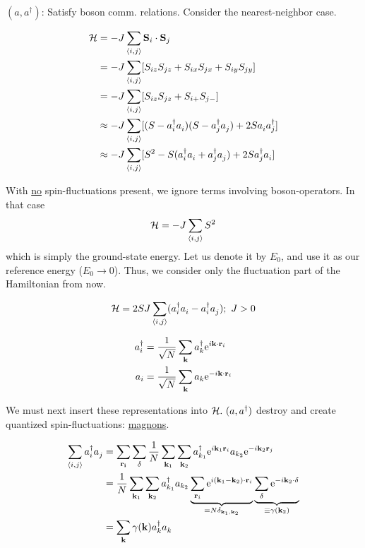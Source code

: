 $(a, a^\dagger)$: Satisfy boson comm. relations. Consider the nearest-neighbor case.

\begin{align}
    \mathcal{H} &= -J\sum_{\langle i,j \rangle} \vb{S}_i\cdot\vb{S}_j \\
    &= -J\sum_{\langle i, j \rangle}[S_{iz}S_{jz} + S_{ix}S_{jx} + S_{iy}S_{jy}]\\
    &= -J\sum_{\langle i, j \rangle}[S_{iz}S_{jz} + S_{i+}S_{j-}] \\
    &\approx -J\sum_{\langle i, j \rangle}[(S-a_i^\dagger a_i^{})(S-a_j^\dagger a_j^{}) + 2S a_i^{} a_j^\dagger]\\
    &\approx -J\sum_{\langle i, j \rangle}[S^2 - S(a_i^\dagger a_i^{} + a_j^\dagger a_j^{}) + 2S a_j^\dagger a_i^{}]
\end{align}

With \uline{no} spin-fluctuations present, we ignore terms involving boson-operators. In that case 
\begin{equation}
    \mathcal{H} = -J \sum_{\langle i, j \rangle} S^2
\end{equation}
which is simply the ground-state energy. Let us denote it by $E_0$, and use it as our reference energy ($E_0 \rightarrow 0$). Thus, we consider only the fluctuation part of the Hamiltonian from now.

\begin{equation}
    \mathcal{H} = 2SJ\sum_{\langle i, j \rangle} (a_i^\dagger a_i^{} - a_i^\dagger a_j^{}); \ J > 0
\end{equation}

\begin{align}
    a_i^\dagger &= \frac{1}{\sqrt{N}}\sum_{\vb{k}}a_k^\dagger \mathrm{e}^{i\vb{k}\cdot\vb{r}_i} \\
    a_i &= \frac{1}{\sqrt{N}}\sum_{\vb{k}}a_k \mathrm{e}^{-i\vb{k}\cdot\vb{r}_i}
\end{align}

We must next insert these representations into $\mathcal{H}. \ (a, a^\dagger)$ destroy and create quantized spin-fluctuations: \uline{magnons}.

\begin{align}
    \sum_{\langle i, j \rangle} a_i^\dagger a_j^{}
    &= \sum_{\vb{r_i}}\sum_{\vb{\delta}} \frac{1}{N}\sum_{\vb{k}_1}\sum_{\vb{k}_2}a_{k_1}^\dagger \mathrm{e}^{i\vb{k}_1\vb{r}_i} a_{k_2} \mathrm{e}^{-i\vb{k}_2\vb{r}_j} \\
    &= \frac{1}{N}\sum_{\vb{k}_1}\sum_{\vb{k}_2}a_{k_1}^\dagger a_{k_2} \underbrace{\sum_{\vb{r}_i}\mathrm{e}^{i(\vb{k}_1 - \vb{k}_2)\cdot\vb{r}_i}}_{= N \delta_{\vb{k}_1, \vb{k}_2}} \underbrace{\sum_{\vb{\delta}}\mathrm{e}^{-i\vb{k}_2\cdot \vb{\delta}}}_{\equiv\gamma(\vb{k}_2)} \\
    &= \sum_{\vb{k}}\gamma(\vb{k})a_k^\dagger a_k^{}
\end{align}

